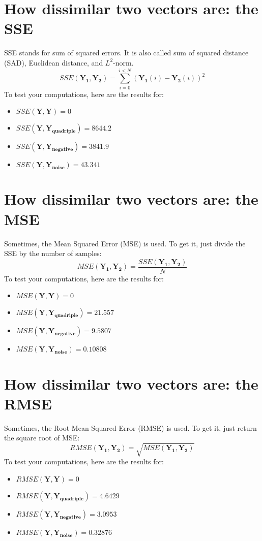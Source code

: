 \documentclass[english,a4paper,12pt,oneside]{article}
\begin{document}
\section{How dissimilar two vectors are: the SSE}

SSE stands for sum of squared  errors. It is also called sum of squared distance (SAD), Euclidean distance, and $L^2$-norm.  
\begin{equation}
SSE(\mathbf{Y_1}, \mathbf{Y_2}) = \sum^{i < N}_{i=0} (\mathbf{Y_1}(i)-\mathbf{Y_2}(i))^2
\end{equation}
To test your computations, here are the results for:
\begin{itemize}
\item $SSE(\mathbf{Y}, \mathbf{Y}) =  0$
\item $SSE(\mathbf{Y}, \mathbf{Y_{quadriple}}) =  8644.2$
\item $SSE(\mathbf{Y}, \mathbf{Y_{negative}}) =  3841.9$
\item $SSE(\mathbf{Y}, \mathbf{Y_{noise}}) =  43.341$
\end{itemize}


\section{How dissimilar two vectors are: the MSE}

Sometimes, the Mean Squared Error (MSE) is used. To get it, just divide the SSE by the number of samples:
\begin{equation}
MSE(\mathbf{Y_1}, \mathbf{Y_2}) = \frac{SSE(\mathbf{Y_1}, \mathbf{Y_2})}{N}
\end{equation}
To test your computations, here are the results for:
\begin{itemize}
\item $MSE(\mathbf{Y}, \mathbf{Y}) =  0$
\item $MSE(\mathbf{Y}, \mathbf{Y_{quadriple}}) =  21.557$
\item $MSE(\mathbf{Y}, \mathbf{Y_{negative}}) =  9.5807$
\item $MSE(\mathbf{Y}, \mathbf{Y_{noise}}) =  0.10808$
\end{itemize}

\section{How dissimilar two vectors are: the RMSE}

Sometimes, the Root Mean Squared Error (RMSE) is used. To get it, just return the square root of MSE:
\begin{equation}
RMSE(\mathbf{Y_1}, \mathbf{Y_2}) = \sqrt{MSE(\mathbf{Y_1}, \mathbf{Y_2})}
\end{equation}
To test your computations, here are the results for:
\begin{itemize}
\item $RMSE(\mathbf{Y}, \mathbf{Y}) =  0$
\item $RMSE(\mathbf{Y}, \mathbf{Y_{quadriple}}) =  4.6429$
\item $RMSE(\mathbf{Y}, \mathbf{Y_{negative}}) =  3.0953$
\item $RMSE(\mathbf{Y}, \mathbf{Y_{noise}}) =  0.32876$
\end{itemize}
\end{document}
